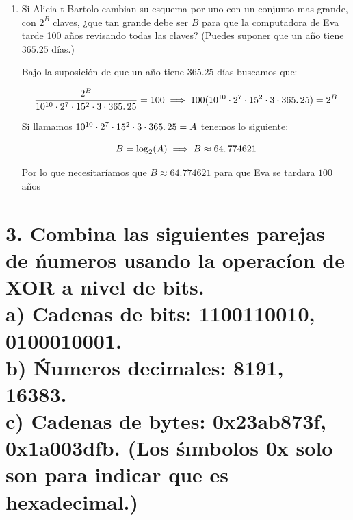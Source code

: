 \documentclass[11pt]{article}
\begin{document}
\begin{enumerate}[label=\alph*)]
            \item Si Alicia t Bartolo cambian su esquema por uno con un conjunto mas grande, con $2^{B}$ claves, ¿que tan grande debe ser $B$ para que la computadora de Eva tarde 100 años revisando todas las claves? (Puedes suponer que un año tiene $365.25$ días.)
            
            Bajo la suposición de que un año tiene $365.25$ días buscamos que:
            
            \begin{equation}
                \frac{2^B}{10^{10} \cdot 2^7 \cdot 15^2 \cdot 3 \cdot 365\ldotp25} = 100 \implies 100 (10^{10} \cdot 2^7 \cdot 15^2 \cdot 3 \cdot 365\ldotp25) = 2^B
            \end{equation}
            
            Si llamamos $10^{10} \cdot 2^7 \cdot 15^2 \cdot 3 \cdot 365\ldotp25 = A$ tenemos lo siguiente:
            
            \begin{equation}
                B = \log_2(A) \implies B \approx 64\ldotp774621
            \end{equation}
            
            Por lo que necesitaríamos que $B \approx 64$.$774621$ para que Eva se tardara $100$ años
            
        \end{enumerate}
    
    
    
    
     \section*{3. Combina las siguientes parejas de ńumeros usando la operacíon de XOR a nivel de bits.\\
a) Cadenas de bits: 1100110010, 0100010001.\\
b) Ńumeros decimales: 8191, 16383.\\
c) Cadenas de bytes: 0x23ab873f, 0x1a003dfb. (Los śımbolos 0x solo son para indicar que es
hexadecimal.)}
\end{document}
